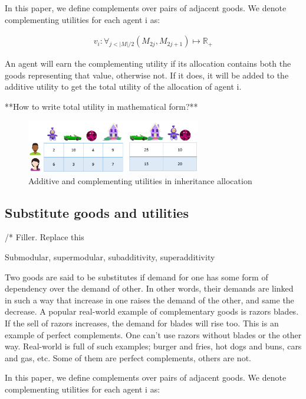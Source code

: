 In this paper, we define complements over pairs of adjacent goods. We denote complementing utilities for each agent i as: 

\begin{gather}
    v_i: \forall_{j < |M|/2} (M_{2j}, M_{2j+1})\mapsto \mathbb{R_+}
\end{gather}

An agent will earn the complementing utility if its allocation contains both the goods representing that value, otherwise not. If it does, it will be added to the additive utility to get the total utility of the allocation of agent i.

**How to write total utility in mathematical form?**

\begin{figure}
\includegraphics[width=3in]{images/complementary_values.png}
\caption{Additive and complementing utilities in inheritance allocation}
\end{figure}


\subsection{Substitute goods and utilities}
\label{section_substitute}

/* Filler. Replace this

Submodular, supermodular, subadditivity, superadditivity

Two goods are said to be substitutes if demand for one has some form of dependency over the demand of other. In other words, their demands are linked in such a way that increase in one raises the demand of the other, and same the decrease. A popular real-world example of complementary goods is razors blades. If the sell of razors increases, the demand for blades will rise too. This is an example of perfect complements. One can't use razors without blades or the other way. Real-world is full of such examples; burger and fries, hot dogs and buns, cars and gas, etc. Some of them are perfect complements, others are not.

In this paper, we define complements over pairs of adjacent goods. We denote complementing utilities for each agent i as: 

